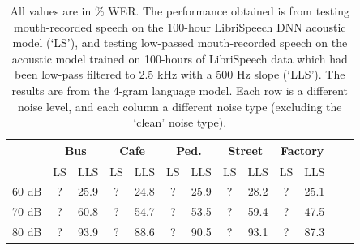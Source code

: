 \begin{table}[h]
\begin{center}
\begin{tabular}{| c || c | c | c | c | c | c | c | c | c | c | c | c |} \hline
      & \multicolumn{2}{|c|}{Bus} & \multicolumn{2}{|c|}{Cafe} & \multicolumn{2}{|c|}{Ped.} & \multicolumn{2}{|c|}{Street} & \multicolumn{2}{|c|}{Factory} \\ \hline
      & LS & LLS & LS & LLS & LS & LLS & LS & LLS & LS & LLS \\ \hline\hline
60 dB & ? & 25.9 & ? & 24.8 & ? & 25.9 & ? & 28.2 & ? & 25.1  \\ \hline
70 dB & ? & 60.8 & ? & 54.7 & ? & 53.5 & ? & 59.4 & ? & 47.5  \\ \hline
80 dB & ? & 93.9 & ? & 88.6 & ? & 90.5 & ? & 93.1 & ? & 87.3  \\ \hline
\end{tabular}
\end{center}
\caption{All values are in \% WER. The performance obtained is from testing mouth-recorded speech on the 100-hour LibriSpeech DNN acoustic model (`LS'), and testing low-passed mouth-recorded speech on the acoustic model trained on 100-hours of LibriSpeech data which had been low-pass filtered to 2.5 kHz with a 500 Hz slope (`LLS').  The results are from the 4-gram language model.  Each row is a different noise level, and each column a different noise type (excluding the `clean' noise type).}\label{tab:lp-mrs-fb-mrs}
\end{table}





